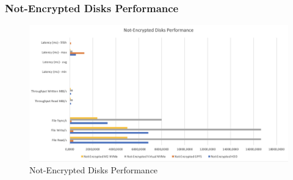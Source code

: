 \subsubsection{Not-Encrypted Disks Performance}
\begin{figure}
  \includegraphics[width=16cm]{images/image12.png}
  \centering
  \caption{Not-Encrypted Disks Performance}
\end{figure}
